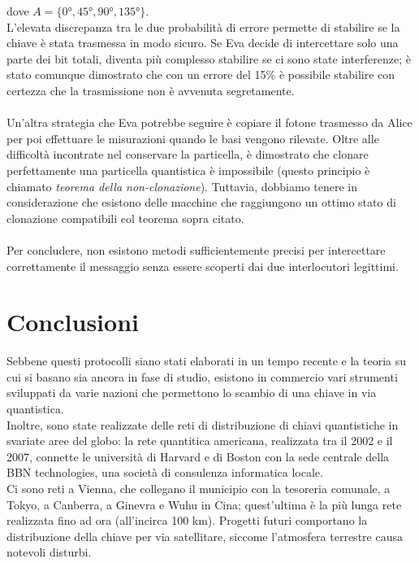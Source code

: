 \documentclass[italian,A4,12pt]{article}
\begin{document}
    dove $A=\{\ang{0},\ang{45},\ang{90},\ang{135}\}$.\\
    L'elevata discrepanza tra le due probabilità di errore permette di stabilire se la chiave è stata trasmessa in modo sicuro.
    Se Eva decide di intercettare solo una parte dei bit totali, diventa più complesso stabilire se ci sono state interferenze; è stato comunque dimostrato che con un errore del 15\% è possibile stabilire con certezza che la trasmissione non è avvenuta segretamente.\\\\
    Un'altra strategia che Eva potrebbe seguire è copiare il fotone trasmesso da Alice per poi effettuare le misurazioni quando le basi vengono rilevate. Oltre alle difficoltà incontrate nel conservare la particella, è dimostrato che clonare perfettamente una particella quantistica è impossibile (questo principio è chiamato \textit{teorema della non-clonazione}).
    Tuttavia, dobbiamo tenere in considerazione che esistono delle macchine che raggiungono un ottimo stato di clonazione compatibili col teorema sopra citato.\\\\
     Per concludere, non esistono metodi sufficientemente precisi per intercettare correttamente il messaggio senza essere scoperti dai due interlocutori legittimi.
     \newpage
  \section{Conclusioni}
     Sebbene questi protocolli siano stati elaborati in un tempo recente e la teoria su cui si basano sia ancora in fase di studio, esistono in commercio vari strumenti sviluppati da varie nazioni che permettono lo scambio di una chiave in via quantistica.\\
     Inoltre, sono state realizzate delle reti di distribuzione di chiavi quantistiche in svariate aree del globo: la rete quantitica americana, realizzata tra il 2002 e il 2007, connette le università di Harvard e di Boston con la sede centrale della BBN technologies, una società di consulenza informatica locale.\\
     Ci sono reti a Vienna, che collegano il municipio con la tesoreria comunale, a Tokyo, a Canberra, a Ginevra e Wuhu in Cina; quest'ultima è la più lunga rete realizzata fino ad ora (all'incirca 100 km). Progetti futuri comportano la distribuzione della chiave per via satellitare, siccome l'atmosfera terrestre causa notevoli disturbi.
     \newpage
\end{document}
